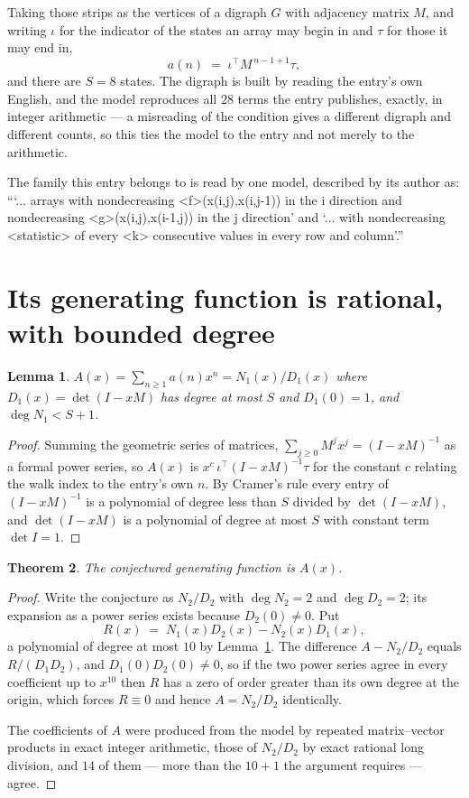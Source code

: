 \documentclass[11pt,a4paper]{article}
\theoremstyle{plain}
\newtheorem{theorem}{Theorem}
\newtheorem{lemma}[theorem]{Lemma}
\theoremstyle{definition}
\begin{document}
Taking those strips as the vertices of a digraph $G$ with adjacency matrix $M$, and writing
$\iota$ for the indicator of the states an array may begin in and $\tau$ for those it may end
in,
\[
a(n)\;=\;\iota^{\!\top}M^{\,n-1+1}\tau ,
\]
and there are $S=8$ states. The digraph is built by reading the entry's own English, and the
model reproduces all $28$ terms the entry publishes, exactly, in integer arithmetic --- a
misreading of the condition gives a different digraph and different counts, so this ties the
model to the entry and not merely to the arithmetic.

The family this entry belongs to is read by one model, described by its author as: ```... arrays with nondecreasing <f>(x(i,j),x(i,j-1)) in the i direction and nondecreasing <g>(x(i,j),x(i-1,j)) in the j direction' and `... with nondecreasing <statistic> of every <k> consecutive values in every row and column'.''


\section{Its generating function is rational, with bounded degree}

\begin{lemma}\label{lem:rat}
$A(x)=\sum_{n\ge1}a(n)x^n=N_1(x)/D_1(x)$ where $D_1(x)=\det(I-xM)$ has degree at most
$S$ and $D_1(0)=1$, and $\deg N_1<S+1$.
\end{lemma}

\begin{proof}
Summing the geometric series of matrices, $\sum_{j\ge0}M^jx^j=(I-xM)^{-1}$ as a formal
power series, so $A(x)$ is $x^{c}\,\iota^{\!\top}(I-xM)^{-1}\tau$ for the constant $c$
relating the walk index to the entry's own $n$. By Cramer's rule every entry of
$(I-xM)^{-1}$ is a polynomial of degree less than $S$ divided by $\det(I-xM)$, and
$\det(I-xM)$ is a polynomial of degree at most $S$ with constant term $\det I=1$.
\end{proof}

\begin{theorem}
The conjectured generating function is $A(x)$.
\end{theorem}

\begin{proof}
Write the conjecture as $N_2/D_2$ with $\deg N_2=2$ and $\deg D_2=2$; its expansion as a
power series exists because $D_2(0)\neq0$. Put
\[
R(x)\;=\;N_1(x)D_2(x)-N_2(x)D_1(x),
\]
a polynomial of degree at most $10$ by Lemma~\ref{lem:rat}. The difference
$A-N_2/D_2$ equals $R/(D_1D_2)$, and $D_1(0)D_2(0)\neq0$, so if the two power series agree in
every coefficient up to $x^{10}$ then $R$ has a zero of order greater than its own
degree at the origin, which forces $R\equiv0$ and hence $A=N_2/D_2$ identically.

The coefficients of $A$ were produced from the model by repeated matrix--vector products in
exact integer arithmetic, those of $N_2/D_2$ by exact rational long division, and $14$
of them --- more than the $10+1$ the argument requires --- agree.
\end{proof}
\end{document}
